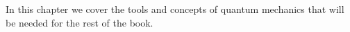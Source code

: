 
In this chapter we cover the tools and concepts of quantum mechanics that will be needed for the rest of the book.
